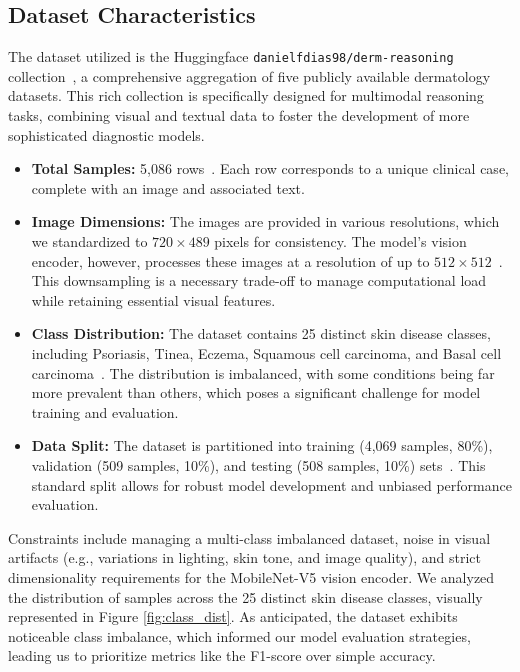 \documentclass[11pt]{article}
\begin{document}
\subsection{Dataset Characteristics}
The dataset utilized is the Huggingface \texttt{danielfdias98/derm-reasoning} collection~\cite{dias2026derm-reasoning}, a comprehensive aggregation of five publicly available dermatology datasets. This rich collection is specifically designed for multimodal reasoning tasks, combining visual and textual data to foster the development of more sophisticated diagnostic models.
\begin{itemize}
    \item \textbf{Total Samples:} 5,086 rows~\cite{dias2026derm-reasoning}. Each row corresponds to a unique clinical case, complete with an image and associated text.
    \item \textbf{Image Dimensions:} The images are provided in various resolutions, which we standardized to $720 \times 489$ pixels for consistency. The model's vision encoder, however, processes these images at a resolution of up to $512 \times 512$~\cite{gemma_3n_2025}. This downsampling is a necessary trade-off to manage computational load while retaining essential visual features.
    \item \textbf{Class Distribution:} The dataset contains 25 distinct skin disease classes, including Psoriasis, Tinea, Eczema, Squamous cell carcinoma, and Basal cell carcinoma~\cite{dias2026derm-reasoning}. The distribution is imbalanced, with some conditions being far more prevalent than others, which poses a significant challenge for model training and evaluation.
    \item \textbf{Data Split:} The dataset is partitioned into training (4,069 samples, 80\%), validation (509 samples, 10\%), and testing (508 samples, 10\%) sets~\cite{dias2026derm-reasoning}. This standard split allows for robust model development and unbiased performance evaluation.
\end{itemize}

Constraints include managing a multi-class imbalanced dataset, noise in visual artifacts (e.g., variations in lighting, skin tone, and image quality), and strict dimensionality requirements for the MobileNet-V5 vision encoder. We analyzed the distribution of samples across the 25 distinct skin disease classes, visually represented in Figure \ref{fig:class_dist}. As anticipated, the dataset exhibits noticeable class imbalance, which informed our model evaluation strategies, leading us to prioritize metrics like the F1-score over simple accuracy.
\end{document}
